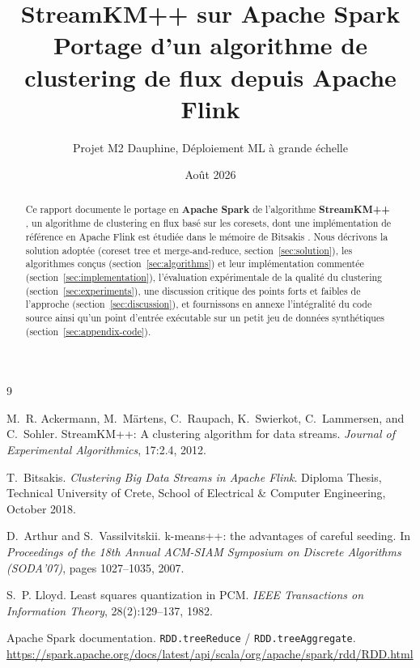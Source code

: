 \documentclass[11pt,a4paper]{article}
\title{\textbf{StreamKM++ sur Apache Spark}\\
\large Portage d'un algorithme de clustering de flux depuis Apache Flink}
\author{Projet M2 Dauphine, Déploiement ML à grande échelle}
\date{Août 2026}
\begin{document}
\maketitle

\begin{abstract}
Ce rapport documente le portage en \textbf{Apache Spark} de l'algorithme
\textbf{StreamKM++} \cite{ackermann2012}, un algorithme de clustering en flux
basé sur les coresets, dont une implémentation de référence en Apache Flink
est étudiée dans le mémoire de Bitsakis \cite{bitsakis2018}. Nous décrivons
la solution adoptée (coreset tree et merge-and-reduce, section~\ref{sec:solution}),
les algorithmes conçus (section~\ref{sec:algorithms}) et leur implémentation
commentée (section~\ref{sec:implementation}), l'évaluation expérimentale de
la qualité du clustering (section~\ref{sec:experiments}), une discussion
critique des points forts et faibles de l'approche
(section~\ref{sec:discussion}), et fournissons en annexe l'intégralité du
code source ainsi qu'un point d'entrée exécutable sur un petit jeu de
données synthétiques (section~\ref{sec:appendix-code}).
\end{abstract}

\tableofcontents
\newpage








\appendix


\begin{thebibliography}{9}

M.~R. Ackermann, M.~Märtens, C.~Raupach, K.~Swierkot, C.~Lammersen, and
C.~Sohler.
\newblock StreamKM++: A clustering algorithm for data streams.
\newblock \emph{Journal of Experimental Algorithmics}, 17:2.4, 2012.

T.~Bitsakis.
\newblock \emph{Clustering Big Data Streams in Apache Flink}.
\newblock Diploma Thesis, Technical University of Crete, School of
Electrical \& Computer Engineering, October 2018.

D.~Arthur and S.~Vassilvitskii.
\newblock k-means++: the advantages of careful seeding.
\newblock In \emph{Proceedings of the 18th Annual ACM-SIAM Symposium on
Discrete Algorithms (SODA'07)}, pages 1027--1035, 2007.

S.~P. Lloyd.
\newblock Least squares quantization in PCM.
\newblock \emph{IEEE Transactions on Information Theory}, 28(2):129--137,
1982.

Apache Spark documentation.
\newblock \texttt{RDD.treeReduce} / \texttt{RDD.treeAggregate}.
\newblock \url{https://spark.apache.org/docs/latest/api/scala/org/apache/spark/rdd/RDD.html}

\end{thebibliography}
\end{document}
